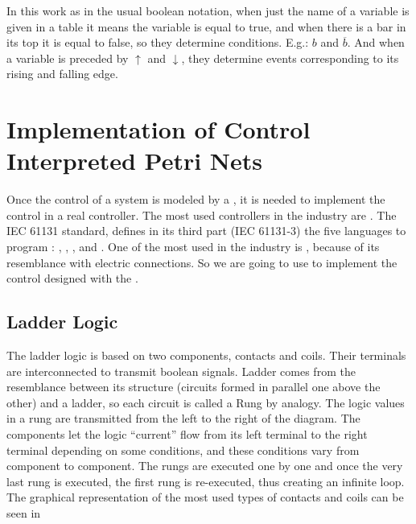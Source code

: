 In this work as in the usual boolean notation, when just the name of a variable is given in a table it means the
variable is equal to true, and when there is a bar in its top it is equal to
false, so they determine conditions. E.g.: $b$ and $\overline{b}$.
And when a variable is preceded by $\uparrow$ and $\downarrow$, they  determine
events corresponding to its rising and falling edge.

\usetikzlibrary{arrows,shapes,circuits.plc.ladder,external}

\section{Implementation of Control Interpreted Petri Nets}
\label{sec:implementPetriNets}
Once the control of a system is modeled by a \CIPN, it
is needed to implement the control in a real controller. The most used
controllers in the industry are \PLCs. The IEC 61131 standard,
defines in its third part (IEC 61131-3) the 
five languages to program \PLCs: \LD, \FBD, \ST, \IL{} and \SFC. One of the most used in the industry is \LD, because of its
resemblance with electric connections. So we are going to use \LD{} to implement the
control designed with the \CIPN.

\subsection{Ladder Logic}
\label{sec:ladder}

The ladder logic is based on two components, contacts and coils. Their terminals are
interconnected to transmit boolean signals.
Ladder comes from the resemblance between its structure (circuits formed in
parallel one above the other) and a ladder, so each circuit is called a Rung by analogy. The logic
values in a \LD{} rung
are transmitted from the left to the right of the diagram. The components let
the logic ``current'' flow from its left terminal to the right terminal
depending on some conditions, and these conditions vary from component to
component.
The rungs are executed one by one and once the very last rung is executed,
the first rung is re-executed, thus creating an infinite loop. 
 The graphical representation of the most used types of contacts and coils
can be seen in 

\newlength{\ladderskip}
\newlength{\ladderrungsep}

